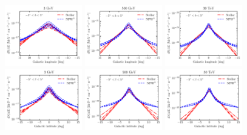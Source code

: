 \documentclass[doublespace,nopageskip]{VTthesis} %
\begin{document}
\begin{figure}[htb]
    \centering
    \includegraphics[width=0.3\textwidth]{Figures/IC_MSPs/lon_3gev.pdf}
    \includegraphics[width=0.3\textwidth]{Figures/IC_MSPs/lon_500gev.pdf}
    \includegraphics[width=0.3\textwidth]{Figures/IC_MSPs/lon_30tev.pdf}
    \includegraphics[width=0.3\textwidth]{Figures/IC_MSPs/lat_3gev.pdf}
    \includegraphics[width=0.3\textwidth]{Figures/IC_MSPs/lat_500gev.pdf}
    \includegraphics[width=0.3\textwidth]{Figures/IC_MSPs/lat_30tev.pdf}

\end{figure}
\end{document}
